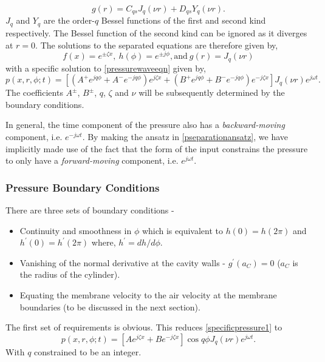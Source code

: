 \begin{equation}
 g(r)=C_{qs}J_q(\nu r)+D_{qs}Y_q(\nu r).
\end{equation}
$J_q$ and $Y_q$ are the order-$q$ Bessel functions of the first and second kind respectively. The Bessel function of the second kind can be ignored as it diverges at $r=0$.
The solutions to the separated equations are therefore given by,
\begin{equation}
 f(x)=e^{\pm \zeta x},\ h(\phi)=e^{\pm j\phi},\text{and}\ g(r)=J_q(\nu r)
\end{equation}
with a specific solution to \eqref{pressurewaveeqn} given by,
\begin{equation}\label{specificpressure1}
 p(x,r,\phi;t)=\left[(A^+e^{jq\phi}+A^-e^{-jq\phi})e^{j\zeta x}+(B^+e^{jq\phi}+B^-e^{-jq\phi})e^{-j\zeta x}\right]J_q(\nu r)e^{j\omega t}.
\end{equation}
The coefficients $A^\pm$, $B^\pm$, $q$, $\zeta$ and $\nu$ will be subsequently determined by the boundary conditions. 

In general, the time component of the pressure also has a \textit{backward-moving} component, i.e. $e^{-j\omega t}$. By making the ansatz in \eqref{pseparationansatz}, 
we have implicitly made use of the fact that the form of the input constrains the pressure to only have a \textit{forward-moving} component, i.e. $e^{j\omega t}$.  
\subsubsection{Pressure Boundary Conditions}\label{pressureboundaryconditions}
There are three sets of boundary conditions - 
\begin{itemize}
 \item Continuity and smoothness in $\phi$ which is equivalent to $h(0)=h(2\pi)$ and $h^\prime(0)=h^\prime(2\pi)$ where, $h^\prime=dh/d\phi$.
 \item Vanishing of the normal derivative at the cavity walls - $g^\prime(a_C)=0$ ($a_C$ is the radius of the cylinder).
 \item Equating the membrane velocity to the air velocity at the membrane boundaries (to be discussed in the next section).
\end{itemize}
The first set of requirements is obvious. This reduces \eqref{specificpressure1} to 
\begin{equation}\label{specificpressure2}
 p(x,r,\phi;t)=\left[Ae^{j\zeta x}+Be^{-j\zeta x}\right]\cos q\phi J_q(\nu r)e^{j\omega t}.
\end{equation}
With $q$ constrained to be an integer.

